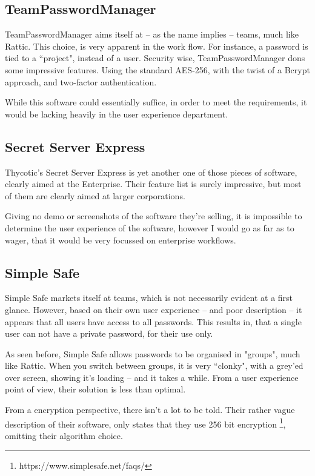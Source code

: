 		\subsection{TeamPasswordManager}
			TeamPasswordManager aims itself at -- as the name implies -- teams, much like Rattic. This choice, is very apparent in the work flow. For instance, a password is tied to a ``project", instead of a user. Security wise, TeamPasswordManager dons some impressive features. Using the standard AES-256, with the twist of a Bcrypt approach, and two-factor authentication.

			While this software could essentially suffice, in order to meet the requirements, it would be lacking heavily in the user experience department.



		\subsection{Secret Server Express}
			Thycotic's Secret Server Express is yet another one of those pieces of software, clearly aimed at the Enterprise. Their feature list is surely impressive, but most of them are clearly aimed at larger corporations. 

			Giving no demo or screenshots of the software they're selling, it is impossible to determine the user experience of the software, however I would go as far as to wager, that it would be very focussed on enterprise workflows.

		\subsection{Simple Safe}
			Simple Safe markets itself at teams, which is not necessarily evident at a first glance. However, based on their own user experience -- and poor description -- it appears that all users have access to all passwords. This results in, that a single user can not have a private password, for their use only.

			As seen before, Simple Safe allows passwords to be organised in "groups", much like Rattic. When you switch between groups, it is very ``clonky", with a grey'ed over screen, showing it's loading -- and it takes a while. From a user experience point of view, their solution is less than optimal.

			From a encryption perspective, there isn't a lot to be told. Their rather vague description of their software, only states that they use 256 bit encryption \footnote{https://www.simplesafe.net/faqs/}, omitting their algorithm choice.


